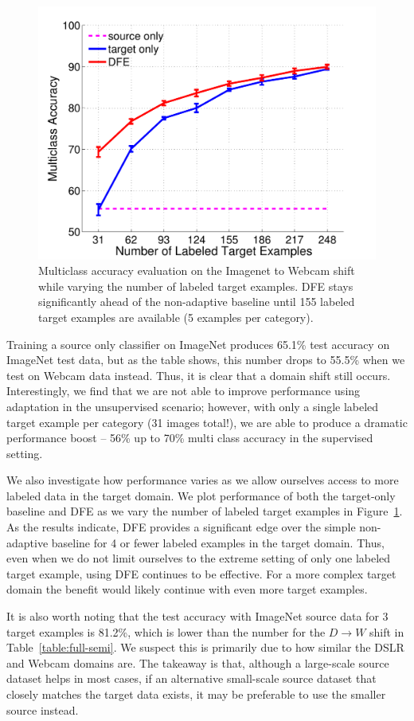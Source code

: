 \begin{figure}
  \vspace{-3em}
  \begin{center}
  \includegraphics[width=.45\textwidth]{figs/imagenet_webcam_vary_num_target_examples}
  \end{center}
  \caption{Multiclass accuracy evaluation on the Imagenet to Webcam shift while varying the number of labeled target examples. DFE stays significantly ahead of the non-adaptive baseline until 155 labeled target examples are available (5 examples per category).}
  \label{fig:vary_num_target}
\end{figure}

Training a source only classifier on ImageNet produces 65.1\% test accuracy on ImageNet test data, but as the table shows, this number drops to 55.5\% when we test on Webcam data instead. Thus, it is clear that a domain shift still occurs.
Interestingly, we find that we are not able to improve performance using adaptation in the unsupervised scenario; however, with only a single labeled target example per category (31 images total!), we are able to produce a dramatic performance boost -- 56\% up to 70\% multi class accuracy in the supervised setting.

We also investigate how performance varies as we allow ourselves access to more labeled data in the target domain. We plot performance of both the target-only baseline and DFE as we vary the number of labeled target examples in Figure~\ref{fig:vary_num_target}.
As the results indicate, DFE provides a significant edge over the simple non-adaptive baseline for 4 or fewer labeled examples in the target domain. Thus, even when we do not limit ourselves to the extreme setting of only one labeled target example, using DFE continues to be effective. For a more complex target domain the benefit would likely continue with even more target examples.

It is also worth noting that the test accuracy with ImageNet source data for 3 target examples is 81.2\%, which is lower than the number for the $D \rightarrow W$ shift in Table~\ref{table:full-semi}.
We suspect this is primarily due to how similar the DSLR and Webcam domains are.
The takeaway is that, although a large-scale source dataset helps in most cases, if an alternative small-scale source dataset that closely matches the target data exists, it may be preferable to use the smaller source instead.

